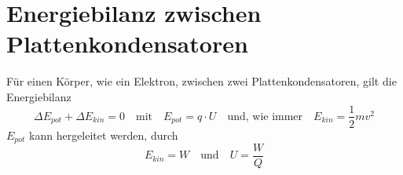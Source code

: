 \documentclass{article}
\begin{document}
 
\section{Energiebilanz zwischen Plattenkondensatoren}
Für einen Körper, wie ein Elektron, zwischen zwei Plattenkondensatoren, gilt die Energiebilanz
\[
 \Delta E_{pot} + \Delta E_{kin} = 0
 \quad \text{mit} \quad
 E_{pot} = q \cdot U
 \quad \text{und, wie immer} \quad
 E_{kin} = \frac{1}{2} mv^2
\] 
$E_{pot}$ kann hergeleitet werden, durch 
\[
 E_{kin} = W
 \quad \text{und} \quad
 U = \frac{W}{Q} 
\] 
\end{document}
